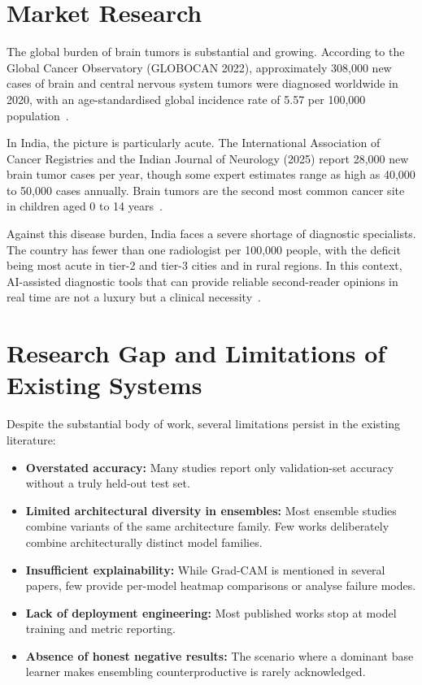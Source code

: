 \documentclass[12pt,a4paper,oneside]{report}
\begin{document}
\section{Market Research}

The global burden of brain tumors is substantial and growing. According to the Global Cancer Observatory (GLOBOCAN 2022), approximately 308,000 new cases of brain and central nervous system tumors were diagnosed worldwide in 2020, with an age-standardised global incidence rate of 5.57 per 100,000 population~\cite{globocan2022}.

In India, the picture is particularly acute. The International Association of Cancer Registries and the Indian Journal of Neurology (2025) report 28,000 new brain tumor cases per year, though some expert estimates range as high as 40,000 to 50,000 cases annually. Brain tumors are the second most common cancer site in children aged 0 to 14 years~\cite{iarc2025}.

Against this disease burden, India faces a severe shortage of diagnostic specialists. The country has fewer than one radiologist per 100,000 people, with the deficit being most acute in tier-2 and tier-3 cities and in rural regions. In this context, AI-assisted diagnostic tools that can provide reliable second-reader opinions in real time are not a luxury but a clinical necessity~\cite{iarc2025}.

\section{Research Gap and Limitations of Existing Systems}

Despite the substantial body of work, several limitations persist in the existing literature:

\begin{itemize}[leftmargin=*]
  \item \textbf{Overstated accuracy:} Many studies report only validation-set accuracy without a truly held-out test set.
  \item \textbf{Limited architectural diversity in ensembles:} Most ensemble studies combine variants of the same architecture family. Few works deliberately combine architecturally distinct model families.
  \item \textbf{Insufficient explainability:} While Grad-CAM is mentioned in several papers, few provide per-model heatmap comparisons or analyse failure modes.
  \item \textbf{Lack of deployment engineering:} Most published works stop at model training and metric reporting.
  \item \textbf{Absence of honest negative results:} The scenario where a dominant base learner makes ensembling counterproductive is rarely acknowledged.
\end{itemize}
\end{document}
